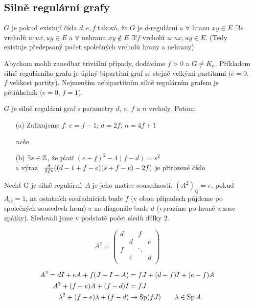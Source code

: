 \subsection{Silně regulární grafy}


\df $G$ je  pokud existují čísla $d, e, f$ taková, že $G$ je $d$-regulární a $\forall$ hranu $xy\in E$ $\exists!e$
vrcholů $u: ux,uy\in E$ a $\forall$ nehranu $xy\not\in E$ $\exists!f$ vrcholů
$u: ux,uy\in E$. (Tedy existuje předepsaný počet společných vrcholů hrany a nehrany)

Abychom mohli zanedbat triviální případy, dodáváme $f>0$ a $G\neq K_n$.
Příkladem silně regulárního grafu je úplný bipartitní graf se stejně velkými
partitami ($e=0$, $f$ velikost partity). Nejmenším nebipartitním silně regulárním grafem je
pětiúhelník ($e=0$, $f=1$).

\vt $G$ je silně regulární graf s parametry $d$, $e$, $f$ a $n$ vrcholy. Potom:
\begin{enumerate}
	\item[(a)] Zafixujeme $f$: $e = f-1$; $d = 2f$; $n = 4f+1$
	\item[] {\it nebo}
	\item[(b)] $\exists s \in \mathbb{Z}$, že platí $(e-f)^2-4(f-d) = s^2$ \\
	a výraz \ ${d\over 2fs}((d-1+f-e)(s+f-e)-2f)$ je přirozené číslo
\end{enumerate}

\dk Nechť G je silně regulární, $A$ je jeho matice sousednosti. $(A^2)_{ij} =
e$, pokud $A_{ij} = 1$, na ostatních souřadnících bude $f$ (v obou připadech půjdeme po společných sousedech hran) a na diagonále bude $d$ (vyrazíme po hraně a zase zpátky). Sledovali jsme v podstatě počet sledů délky $2$.

$$
A^2 = \left(
	\begin{matrix}
		d & & f & \\
		& d & & e \\
		f & & \ddots & \\
		& e & & d\\
	\end{matrix}\right)
$$

\begin{align}
	A^2 = dI + eA + f(J-I-A) &= fJ + (d-f)I + (e-f)A \\
	A^2 + (f-e)A + (f-d)I &= fJ \\
	\lambda^2 + (f-e)\lambda + (f-d) &\rightarrow \operatorname{Sp}(fJ)\qquad \lambda\in\operatorname{Sp} A
\end{align}

